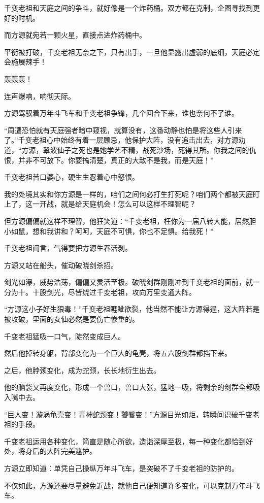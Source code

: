 \begin{this_body}
千变老祖和天庭之间的争斗，就好像是一个炸药桶。双方都在克制，企图寻找到更好的时机。

而方源就宛若一颗火星，直接点进炸药桶中。

平衡被打破，千变老祖无奈之下，只有出手，一旦他显露出虚弱的底细，天庭必定会施展辣手！

轰轰轰！

连声爆响，响彻天际。

方源驾驭着万年斗飞车和千变老祖争锋，几个回合下来，谁也奈何不了谁。

“周遭恐怕就有天庭强者暗中窥视，就算没有，这番动静也怕是将这些人引来了。”千变老祖心中始终有着一层顾忌，他保护大阵，没有追击出去，对方源劝道，“方源，翠波仙子之死也是她学艺不精，战死沙场，死得其所。你我之间的仇恨，并非不可放下。你要搞清楚，真正的大敌不是我，而是天庭！”

千变老祖苦口婆心，硬生生忍着心中怒恨。

我的处境其实和你方源是一样的，咱们之间何必打生打死呢？咱们两个都被天庭盯上了，这一开战，就是给天庭机会！怎么可以这样不理智呢？

但方源偏偏就这样不理智，他狂笑道：“千变老祖，枉你为一届八转大能，居然胆小如鼠，想和我讲和？呵呵，天庭不可惧，你也不足惧。给我死！”

千变老祖闻言，气得要把方源生吞活剥。

方源又站在船头，催动破晓剑杀招。

剑光如瀑，威势浩荡，偏偏又灵活至极。破晓剑群刚刚冲到千变老祖的面前，就一分为十。十股剑光，尽皆绕过千变老祖，攻向万里变通大阵。

“方源这小子好生狠毒！”千变老祖睚眦欲裂，他当然不能让方源得逞，这大阵若是被攻破，里面的女仙必然是要伤亡惨重的。

千变老祖猛吸一口气，陡然变成巨人。

然后他掉转身躯，背部变化为一个巨大的龟壳，将五六股剑群都挡下来。

之后，他脖颈变化，成为蛇颈，长长地衍生出去。

他的脑袋又再度变化，形成一个兽口，兽口大张，猛地一吸，将剩余的剑群全都吸入嘴中去。

“巨人变！漩涡龟壳变！青神蛇颈变！饕餮变！”方源目光如炬，转瞬间识破千变老祖的手段。

千变老祖运用各种变化，简直是随心所欲，造诣深厚至极，每一种变化都恰到好处，将身后的大阵完美遮护。

方源立即知道：单凭自己操纵万年斗飞车，是突破不了千变老祖的防护的。

不仅如此，方源还要尽量避免近战，就他自己便知道许多变化，可以克制万年斗飞车。


\end{this_body}
